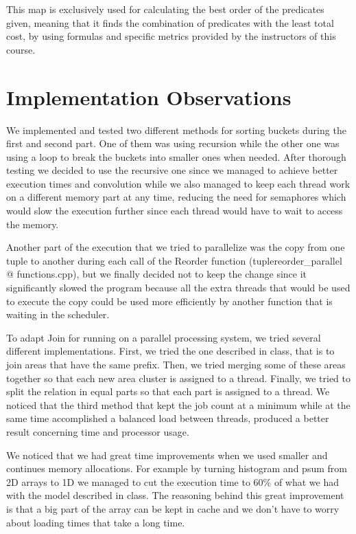 \documentclass{ws-ijprai}
\begin{document}
\tab This map is exclusively used for calculating the best order of the predicates given, meaning that it finds the combination of predicates with the least total cost, by using formulas and specific metrics provided by the instructors of this course.


\section{Implementation Observations}

\tab We implemented and tested two different methods for sorting buckets during the first and second part. One of them was using recursion while the other one was using a loop to break the buckets into smaller ones when needed. After thorough testing we decided to use the recursive one since we managed to achieve better execution times and convolution while we also managed to keep each thread work on a different memory part at any time, reducing the need for semaphores which would slow the execution further since each thread would have to wait to access the memory.

\tab Another part of the execution that we tried to parallelize was the copy from one tuple to another during each call of the Reorder function (tuplereorder\_parallel @ functions.cpp), but we finally decided not to keep the change since it significantly slowed the program because all the extra threads that would be used to execute the copy could be used more efficiently by another function that is waiting in the scheduler.

\tab To adapt Join for running on a parallel processing system, we tried several different implementations. First, we tried the one described in class, that is to join areas that have the same prefix. Then, we tried merging some of these areas together so that each new area cluster is assigned to a thread. Finally, we tried to split the relation in equal parts so that each part is assigned to a thread. We noticed that the third method that kept the job count at a minimum while at the same time accomplished a balanced load between threads, produced a better result concerning time and processor usage.

\tab We noticed that we had great time improvements when we used smaller and continues memory allocations. For example by turning histogram and psum from 2D arrays to 1D we managed to cut the execution time to 60\% of what we had with the model described in class. The reasoning behind this great improvement is that a big part of the array can be kept in cache and we don't have to worry about loading times that take a long time.
\end{document}

